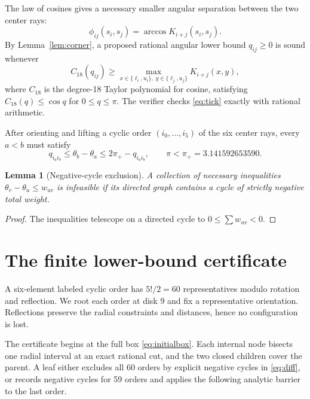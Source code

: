 \documentclass[11pt,a4paper]{article}
\newtheorem{lemma}[theorem]{Lemma}
\begin{document}
The law of cosines gives a necessary smaller angular separation between the two center rays:
\begin{equation}\label{eq:phi}
\phi_{ij}(s_i,s_j)=\arccos K_{i+j}(s_i,s_j).
\end{equation}
By Lemma~\ref{lem:corner}, a proposed rational angular lower bound $q_{ij}\ge0$ is sound whenever
\begin{equation}\label{eq:tick}
C_{18}(q_{ij})\ge\max_{x\in\{\ell_i,u_i\},\;y\in\{\ell_j,u_j\}} K_{i+j}(x,y),
\end{equation}
where $C_{18}$ is the degree-18 Taylor polynomial for cosine, satisfying $C_{18}(q)\le\cos q$ for $0\le q\le\pi$. The verifier checks \eqref{eq:tick} exactly with rational arithmetic.

After orienting and lifting a cyclic order $(i_0,\ldots,i_5)$ of the six center rays, every $a<b$ must satisfy
\begin{equation}\label{eq:diff}
q_{i_ai_b}\le\theta_b-\theta_a\le2\pi_+-q_{i_ai_b},
\qquad \pi<\pi_+=3.141592653590.
\end{equation}
\begin{lemma}[Negative-cycle exclusion]\label{lem:cycle}
A collection of necessary inequalities $\theta_v-\theta_u\le w_{uv}$ is infeasible if its directed graph contains a cycle of strictly negative total weight.
\end{lemma}
\begin{proof}
The inequalities telescope on a directed cycle to $0\le\sum w_{uv}<0$.
\end{proof}

\section{The finite lower-bound certificate}
A six-element labeled cyclic order has $5!/2=60$ representatives modulo rotation and reflection. We root each order at disk $9$ and fix a representative orientation. Reflections preserve the radial constraints and distances, hence no configuration is lost.

The certificate begins at the full box \eqref{eq:initialbox}. Each internal node bisects one radial interval at an exact rational cut, and the two closed children cover the parent. A leaf either excludes all 60 orders by explicit negative cycles in \eqref{eq:diff}, or records negative cycles for 59 orders and applies the following analytic barrier to the last order.
\end{document}
